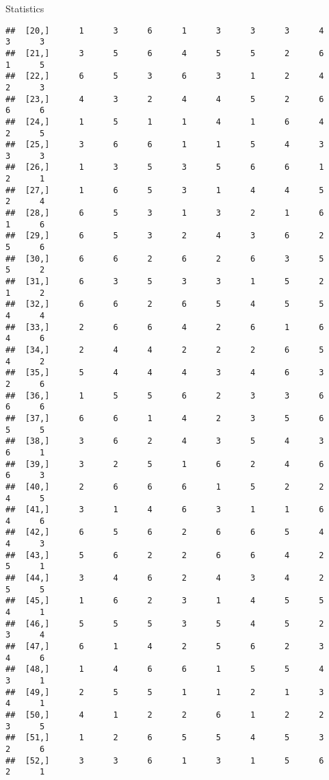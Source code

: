 \documentclass[
  ignorenonframetext,
]{beamer}
\begin{document}
\begin{frame}[fragile]{Statistics}
\begin{verbatim}
##  [20,]      1      3      6      1      3      3      3      4      3      3
##  [21,]      3      5      6      4      5      5      2      6      1      5
##  [22,]      6      5      3      6      3      1      2      4      2      3
##  [23,]      4      3      2      4      4      5      2      6      6      6
##  [24,]      1      5      1      1      4      1      6      4      2      5
##  [25,]      3      6      6      1      1      5      4      3      3      3
##  [26,]      1      3      5      3      5      6      6      1      2      1
##  [27,]      1      6      5      3      1      4      4      5      2      4
##  [28,]      6      5      3      1      3      2      1      6      1      6
##  [29,]      6      5      3      2      4      3      6      2      5      6
##  [30,]      6      6      2      6      2      6      3      5      5      2
##  [31,]      6      3      5      3      3      1      5      2      1      2
##  [32,]      6      6      2      6      5      4      5      5      4      4
##  [33,]      2      6      6      4      2      6      1      6      4      6
##  [34,]      2      4      4      2      2      2      6      5      4      2
##  [35,]      5      4      4      4      3      4      6      3      2      6
##  [36,]      1      5      5      6      2      3      3      6      6      6
##  [37,]      6      6      1      4      2      3      5      6      5      5
##  [38,]      3      6      2      4      3      5      4      3      6      1
##  [39,]      3      2      5      1      6      2      4      6      6      3
##  [40,]      2      6      6      6      1      5      2      2      4      5
##  [41,]      3      1      4      6      3      1      1      6      4      6
##  [42,]      6      5      6      2      6      6      5      4      4      3
##  [43,]      5      6      2      2      6      6      4      2      5      1
##  [44,]      3      4      6      2      4      3      4      2      5      5
##  [45,]      1      6      2      3      1      4      5      5      4      1
##  [46,]      5      5      5      3      5      4      5      2      3      4
##  [47,]      6      1      4      2      5      6      2      3      4      6
##  [48,]      1      4      6      6      1      5      5      4      3      1
##  [49,]      2      5      5      1      1      2      1      3      4      1
##  [50,]      4      1      2      2      6      1      2      2      3      5
##  [51,]      1      2      6      5      5      4      5      3      2      6
##  [52,]      3      3      6      1      3      1      5      6      2      1

\end{verbatim}
\end{frame}
\end{document}

